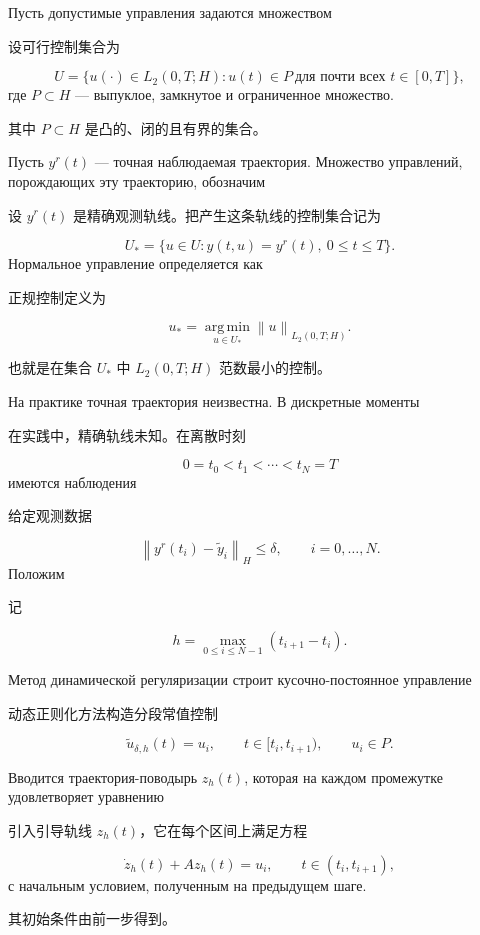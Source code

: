 \documentclass[12pt,a4paper]{article}
\newcommand{\norm}[1]{\left\lVert #1\right\rVert}
\newcommand{\zh}[1]{\par\noindent #1\par}
\begin{document}
Пусть допустимые управления задаются множеством
\zh{设可行控制集合为}
\begin{equation}
    U=\{u(\cdot)\in L_2(0,T;H): u(t)\in P\ \text{для почти всех }t\in[0,T]\},
\end{equation}
где $P\subset H$ --- выпуклое, замкнутое и ограниченное множество.
\zh{其中 $P\subset H$ 是凸的、闭的且有界的集合。}

Пусть $y^r(t)$ --- точная наблюдаемая траектория. Множество управлений, порождающих эту траекторию, обозначим
\zh{设 $y^r(t)$ 是精确观测轨线。把产生这条轨线的控制集合记为}
\begin{equation}
    U_* = \{u\in U:y(t,u)=y^r(t),\ 0\le t\le T\}.
\end{equation}
Нормальное управление определяется как
\zh{正规控制定义为}
\begin{equation}
    u_* = \operatorname*{arg\,min}_{u\in U_*}\norm{u}_{L_2(0,T;H)}.
\end{equation}
\zh{也就是在集合 $U_*$ 中 $L_2(0,T;H)$ 范数最小的控制。}

На практике точная траектория неизвестна. В дискретные моменты
\zh{在实践中，精确轨线未知。在离散时刻}
\[
    0=t_0<t_1<\cdots<t_N=T
\]
имеются наблюдения
\zh{给定观测数据}
\begin{equation}
    \norm{y^r(t_i)-\tilde y_i}_H\le \delta,
    \qquad i=0,\ldots,N.
\end{equation}
Положим
\zh{记}
\begin{equation}
    h=\max_{0\le i\le N-1}(t_{i+1}-t_i).
\end{equation}


Метод динамической регуляризации строит кусочно-постоянное управление
\zh{动态正则化方法构造分段常值控制}
\begin{equation}
    \tilde u_{\delta,h}(t)=u_i,
    \qquad t\in[t_i,t_{i+1}),
    \qquad u_i\in P.
\end{equation}

Вводится траектория-поводырь $z_h(t)$, которая на каждом промежутке удовлетворяет уравнению
\zh{引入引导轨线 $z_h(t)$，它在每个区间上满足方程}
\begin{equation}
    \dot z_h(t)+Az_h(t)=u_i,
    \qquad t\in(t_i,t_{i+1}),
\end{equation}
с начальным условием, полученным на предыдущем шаге.
\zh{其初始条件由前一步得到。}
\end{document}
